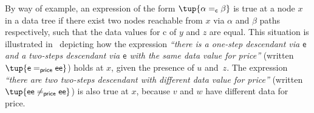 By way of example, an expression of the form $\tup{\alpha =_{\textsf{c}} \beta}$ is true at a node $x$ in a data tree if there exist two nodes reachable from $x$ via $\alpha$ and $\beta$ paths respectively, such that the data values for \textsf{c} of $y$ and $z$ are equal. This situation is illustrated in~ depicting how the expression {\em ``there is
a one-step descendant via $\textsf{e}$ and a two-steps descendant via $\textsf{e}$ with the same data
value for \textsf{price}''} (written $\tup{\textsf{e} =_{\textsf{price}} \textsf{e}\textsf{e}}$) holds at $x$, given the presence of $u$ and~$z$. The
expression {\em ``there are two two-steps descendant with different data value for \textsf{price}''} (written $\tup{\textsf{e}\textsf{e} \neq_{\textsf{price}} \textsf{e}\textsf{e}}$)
is also true at $x$, because $v$ and $w$ have different data for \textsf{price}.


%

